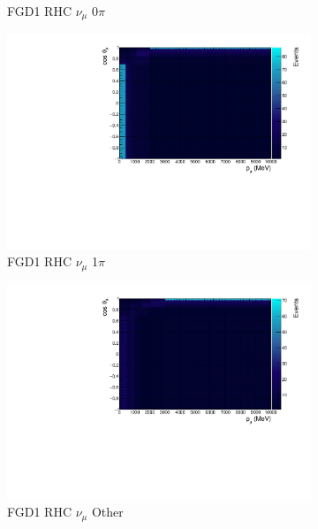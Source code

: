 \begin{figure}
\begin{subfigure}{.32\textwidth}
  \caption{FGD1 RHC $\nu_{\mu}$ 0$\pi$}
  \label{fig:th2dFGD1_NuMuBkg_CC0pi_in_AntiNu_Mode}
\end{subfigure}
\begin{subfigure}{.32\textwidth}
  \centering
  \includegraphics[width=0.95\linewidth]{figs/TH2D_MC_FGD1_NuMuBkg_CC1pi_in_AntiNu_Mode}
  \caption{FGD1 RHC $\nu_{\mu}$ 1$\pi$}
  \label{fig:th2dFGD1_NuMuBkg_CC1pi_in_AntiNu_Mode}
\end{subfigure}
\begin{subfigure}{.32\textwidth}
  \centering
  \includegraphics[width=0.95\linewidth]{figs/TH2D_MC_FGD1_NuMuBkg_CCOther_in_AntiNu_Mode}
  \caption{FGD1 RHC $\nu_{\mu}$ Other}
  \label{fig:th2dFGD1_NuMuBkg_CCOther_in_AntiNu_Mode}
\end{subfigure}
\begin{subfigure}{.32\textwidth}
  \centering

\end{subfigure}
\end{figure}
